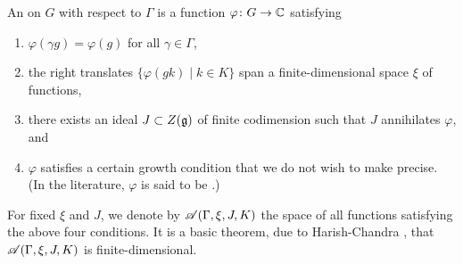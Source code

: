 \begin{definition}\label{def:autform}
An  on $G$ with
respect to $\Gamma$ is a function $\varphi \colon G\rightarrow \mathbb{C}$ satisfying
\begin{enumerate}
\item $\varphi (\gamma g) = \varphi (g)$ for all $\gamma \in \Gamma $,
\item the right translates $\{\varphi  (gk)\mid k\in K \}$ span a finite-dimensional
space $\xi$ of functions,\label{ktype}
\item there exists an ideal $J\subset Z (\mathfrak g)$ of finite codimension
such that $J$ annihilates $\varphi $, and 
\item $\varphi $ satisfies a certain growth condition that we do not
wish to make precise.  (In the literature, $\varphi $ is said to be
.)
\end{enumerate}
\end{definition}

For fixed $\xi$ and $J$, we denote by $\mathscr A(\Gamma ,\xi ,J,K)$ the
space of all functions
satisfying the above four conditions.  It is a basic theorem, due to
Harish-Chandra \cite{harish-chandra}, that $\mathscr A(\Gamma ,\xi ,J,K)$ is
finite-dimensional.

